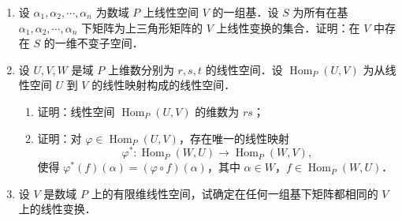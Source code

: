 \begin{enumerate}
\[\begin{pmatrix}
      0&0&1&0\\
      1&0&0&0\\
      0&0&0&1
    \end{pmatrix}.
  \]
  试确定线性空间 $V$ 最多可以写成几个 $S$-子空间的直和．
  \ansgeneral
  \item 设 $\alpha_1,\alpha_2,\cdots,\alpha_n$ 为数域 $P$ 上线性空间 $V$ 的一组基．设 $S$ 为所有在基 $\alpha_1,\alpha_2,\cdots,\alpha_n$ 下矩阵为上三角形矩阵的 $V$ 上线性变换的集合．证明：在 $V$ 中存在 $S$ 的一维不变子空间．
  \ansproof
  \item 设 $U,V,W$ 是域 $P$ 上维数分别为 $r,s,t$ 的线性空间．设 $\operatorname{Hom}_P(U,V)$ 为从线性空间 $U$ 到 $V$ 的线性映射构成的线性空间．%
  \begin{enumerate}
    \item 证明：线性空间 $\operatorname{Hom}_P(U,V)$ 的维数为 $rs$；
  \anssub
    \item 证明：对 $\varphi\in\operatorname{Hom}_P(U,V)$，存在唯一的线性映射
    \[
      \varphi^*:\operatorname{Hom}_P(W,U)\to\operatorname{Hom}_P(W,V),
    \]
    使得 $\varphi^*(f)(\alpha)=(\varphi\circ f)(\alpha)$，其中 $\alpha\in W$，$f\in\operatorname{Hom}_P(W,U)$．
  \anssub
  \end{enumerate}
  \item 设 $V$ 是数域 $P$ 上的有限维线性空间，试确定在任何一组基下矩阵都相同的 $V$ 上的线性变换．
  \ansgeneral
\end{enumerate}
